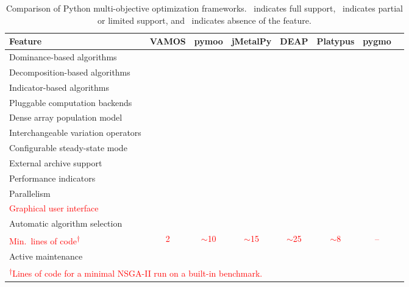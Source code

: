 \documentclass[journal]{IEEEtran}
\newcommand{\cmark}{\ding{51}}
\newcommand{\pmark}{\ding{109}}
\newcommand{\xmark}{\ding{55}}
\begin{document}
\begin{table}[t]
\centering
\caption{Comparison of Python multi-objective optimization frameworks.
\cmark~indicates full support, \pmark~indicates partial or limited support,
and \xmark~indicates absence of the feature.}
\label{tab:framework-comparison}
\renewcommand{\arraystretch}{1.3}
\begin{tabular}{lccccccc}
\toprule
\textbf{Feature} & \textbf{VAMOS} & \textbf{pymoo} & \textbf{jMetalPy} & \textbf{DEAP} & \textbf{Platypus} & \textbf{pygmo} \\
\midrule
Dominance-based algorithms          & \cmark & \cmark & \cmark & \pmark & \cmark & \pmark \\
Decomposition-based algorithms      & \cmark & \cmark & \pmark & \xmark & \cmark & \pmark \\
Indicator-based algorithms          & \cmark & \pmark & \pmark & \xmark & \xmark & \xmark \\
Pluggable computation backends      & \cmark & \xmark & \xmark & \xmark & \xmark & \xmark \\
Dense array population model        & \cmark & \pmark & \xmark & \xmark & \xmark & \xmark \\
Interchangeable variation operators & \cmark & \pmark & \pmark & \cmark & \pmark & \xmark \\
Configurable steady-state mode      & \cmark & \xmark & \pmark & \pmark & \xmark & \xmark \\
External archive support            & \cmark & \xmark & \xmark & \pmark & \pmark & \xmark \\
Performance indicators              & \cmark & \cmark & \pmark & \xmark & \pmark & \xmark \\
Parallelism                         & \pmark & \pmark & \pmark & \cmark & \pmark & \cmark \\
\textcolor{red}{Graphical user interface}            & \textcolor{red}{\cmark} & \textcolor{red}{\xmark} & \textcolor{red}{\xmark} & \textcolor{red}{\xmark} & \textcolor{red}{\xmark} & \textcolor{red}{\xmark} \\
Automatic algorithm selection       & \cmark & \xmark & \xmark & \xmark & \xmark & \xmark \\
\textcolor{red}{Min.\ lines of code\textsuperscript{$\dagger$}} & \textcolor{red}{2} & \textcolor{red}{$\sim$10} & \textcolor{red}{$\sim$15} & \textcolor{red}{$\sim$25} & \textcolor{red}{$\sim$8} & \textcolor{red}{--} \\
Active maintenance                  & \cmark & \cmark & \pmark & \pmark & \xmark & \cmark \\
\bottomrule
\multicolumn{7}{l}{\textcolor{red}{\footnotesize\textsuperscript{$\dagger$}Lines of code for a minimal NSGA-II run on a built-in benchmark.}}
\end{tabular}
\end{table}
\end{document}
